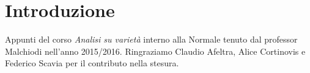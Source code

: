 \chapter{Introduzione}

Appunti del corso \emph{Analisi su varietà} interno alla Normale tenuto dal professor Malchiodi nell'anno 2015/2016.
Ringraziamo Claudio Afeltra, Alice Cortinovis e Federico Scavia per il contributo nella stesura.